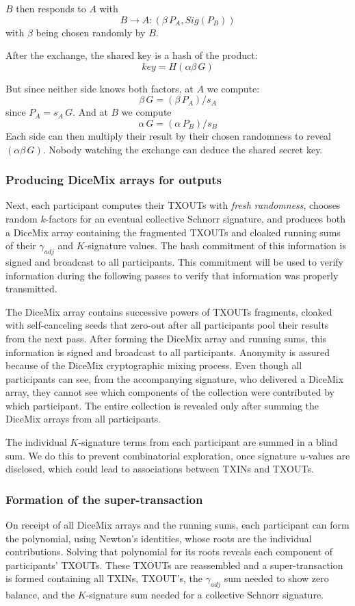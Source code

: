 \documentclass[a4paper, 10pt, conference]{ieeeconf}
\begin{document}
$B$ then responds to $A$ with
$$B \rightarrow A: (\beta \, P_A, Sig(P_B))$$
with $\beta$ being chosen randomly by $B$. 

After the exchange, the shared key is a hash of the product:
$$key = H(\alpha \beta \, G)$$ 

But since neither side knows both factors, at $A$ we compute:
$$\beta \, G = (\beta \, P_A) / s_A$$
since $P_A = s_A \, G$. And at $B$ we compute
$$\alpha \, G = (\alpha \, P_B) / s_B$$
Each side can then multiply their result by their chosen randomness to reveal $(\alpha \beta \, G)$. Nobody watching the exchange can deduce the shared secret key.

\subsubsection{Producing DiceMix arrays for outputs} Next, each participant computes their TXOUTs with \textit{fresh randomness}, chooses random $k$-factors for an eventual collective Schnorr signature, and produces both a DiceMix array containing the fragmented TXOUTs and cloaked running sums of their $\gamma_{adj}$ and $K$-signature values. The hash commitment of this information is signed and broadcast to all participants. This commitment will be used to verify information during the following passes to verify that information was properly transmitted.

The DiceMix array contains successive powers of TXOUTs fragments, cloaked with self-canceling seeds that zero-out after all participants pool their results from the next pass. After forming the DiceMix array and running sums, this information is signed and broadcast to all participants. Anonymity is assured because of the DiceMix cryptographic mixing process. Even though all participants can see, from the accompanying signature, who delivered a DiceMix array, they cannot see which components of the collection were contributed by which participant. The entire collection is revealed only after summing the DiceMix arrays from all participants.

The individual $K$-signature terms from each participant are summed in a blind sum. We do this to prevent combinatorial exploration, once signature $u$-values are disclosed, which could lead to associations between TXINs and TXOUTs.

\subsubsection{Formation of the super-transaction} On receipt of all DiceMix arrays and the running sums, each participant can form the polynomial, using Newton's identities, whose roots are the individual contributions. Solving that polynomial for its roots reveals each component of participants' TXOUTs. These TXOUTs are reassembled and a super-transaction is formed containing all TXINs, TXOUT's, the $\gamma_{adj}$ sum needed to show zero balance, and the $K$-signature sum needed for a collective Schnorr signature.
\end{document}
